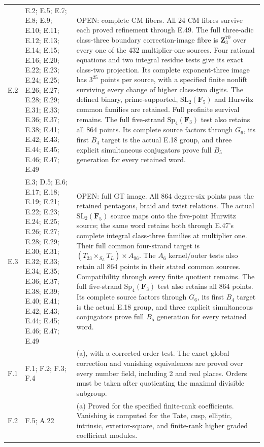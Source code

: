 \begin{longtable}{@{}p{1.1cm}p{3.0cm}p{10.3cm}@{}}
E.2 & E.2; E.5; E.7; E.8; E.9; E.10; E.11; E.12; E.13; E.14; E.15; E.16; E.20; E.22; E.23; E.24; E.25; E.26; E.27; E.28; E.29; E.31; E.33; E.36; E.37; E.38; E.41; E.42; E.43; E.44; E.45; E.46; E.47; E.49 & OPEN: complete CM fibers. All 24 CM fibres survive each proved refinement through E.49. The full three-adic class-three boundary correction-image fibre is $\mathbf Z_3^{70}$ over every one of the 432 multiplier-one sources. Four rational equations and two integral residue tests give its exact class-two projection. Its complete exponent-three image has $3^{25}$ points per source, with a specified finite nonlift surviving every change of higher class-two digits. The defined binary, prime-supported, $\mathrm{SL}_2(\mathbf F_5)$ and Hurwitz common families are retained. Full profinite survival remains. The full five-strand $\mathrm{Sp}_4(\mathbf F_3)$ test also retains all 864 points. Its complete source factors through $G_6$, its first $B_4$ target is the actual E.18 group, and three explicit simultaneous conjugators prove full $B_5$ generation for every retained word. \\
E.3 & E.3; D.5; E.6; E.17; E.18; E.19; E.21; E.22; E.23; E.24; E.25; E.26; E.27; E.28; E.29; E.30; E.31; E.32; E.33; E.34; E.35; E.36; E.37; E.38; E.39; E.40; E.41; E.42; E.43; E.44; E.45; E.46; E.47; E.49 & OPEN: full GT image. All 864 degree-six points pass the retained pentagons, braid and twist relations. The actual $\mathrm{SL}_2(\mathbf F_5)$ source maps onto the five-point Hurwitz source; the same word retains both through E.47's complete integral class-three families at multiplier one. Their full common four-strand target is $(T_{23}\times_{S_L}T_L)\times A_{96}$. The $A_6$ kernel/outer tests also retain all 864 points in their stated common sources. Compatibility through every finite quotient remains. The full five-strand $\mathrm{Sp}_4(\mathbf F_3)$ test also retains all 864 points. Its complete source factors through $G_6$, its first $B_4$ target is the actual E.18 group, and three explicit simultaneous conjugators prove full $B_5$ generation for every retained word. \\
F.1 & F.1; F.2; F.3; F.4 & (a), with a corrected order test. The exact global correction and vanishing equivalences are proved over every number field, including 2 and real places. Orders must be taken after quotienting the maximal divisible subgroup. \\
F.2 & F.5; A.22 & (a) Proved for the specified finite-rank coefficients. Vanishing is computed for the Tate, cusp, elliptic, intrinsic, exterior-square, and finite-rank higher graded coefficient modules. \\

\end{longtable}
